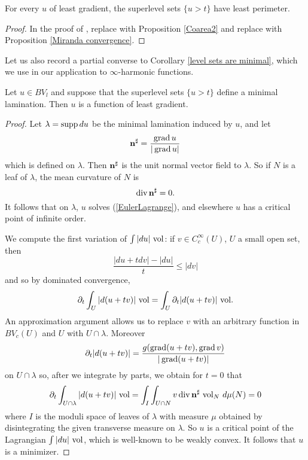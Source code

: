 \begin{corollary}\label{level sets are minimal}
For every $u$ of least gradient, the superlevel sets $\{u > t\}$ have least perimeter.
\end{corollary}
\begin{proof}
In the proof of \cite[Theorem 1]{BOMBIERI1969}, replace \cite[Theorem 1.6]{Miranda66} with Proposition \ref{Coarea2} and replace \cite[Theorem 3]{Miranda67} with Proposition \ref{Miranda convergence}.
\end{proof}

Let us also record a partial converse to Corollary \ref{level sets are minimal}, which we use in our application to $\infty$-harmonic functions.

\begin{proposition}\label{minimal bounding implies least gradient}
Let $u \in BV_l$ and suppose that the superlevel sets $\{u > t\}$ define a minimal lamination.
Then $u$ is a function of least gradient.
\end{proposition}
\begin{proof}
Let $\lambda = \operatorname{supp} du$ be the minimal lamination induced by $u$, and let
$$\mathbf n^\sharp = \frac{\operatorname{grad} u}{|\operatorname{grad} u|}$$
which is defined on $\lambda$. Then $\mathbf n^\sharp$ is the unit normal vector field to $\lambda$.
So if $N$ is a leaf of $\lambda$, the mean curvature of $N$ is
$$\operatorname{div} \mathbf n^\sharp = 0.$$
It follows that on $\lambda$, $u$ solves (\ref{EulerLagrange}), and elsewhere $u$ has a critical point of infinite order.

We compute the first variation of $\int |du| ~\mathrm{vol}$: if $v \in C^\infty_c(U)$, $U$ a small open set, then
$$\frac{|du + tdv| - |du|}{t} \leq |dv|$$
and so by dominated convergence,
$$\partial_t \int_U |d(u + tv)| ~\mathrm{vol} = \int_U \partial_t |d(u + tv)| ~\mathrm{vol}.$$
An approximation argument allows us to replace $v$ with an arbitrary function in $BV_c(U)$ and $U$ with $U \cap \lambda$.
Moreover
$$\partial_t |d(u + tv)| = \frac{g (\operatorname{grad} (u + tv), \operatorname{grad} v)}{|\operatorname{grad} (u + tv)|}$$
on $U \cap \lambda$ so, after we integrate by parts, we obtain for $t = 0$ that
$$\partial_t \int_{U \cap \lambda} |d(u + tv)| ~\mathrm{vol} = \int_I \int_{U \cap N} v\operatorname{div} \mathbf n^\sharp ~\mathrm{vol}_N ~d\mu(N) = 0$$
where $I$ is the moduli space of leaves of $\lambda$ with measure $\mu$ obtained by disintegrating the given transverse measure on $\lambda$.
So $u$ is a critical point of the Lagrangian $\int |du| ~\mathrm{vol}$, which is well-known to be weakly convex.
It follows that $u$ is a minimizer.
\end{proof}

